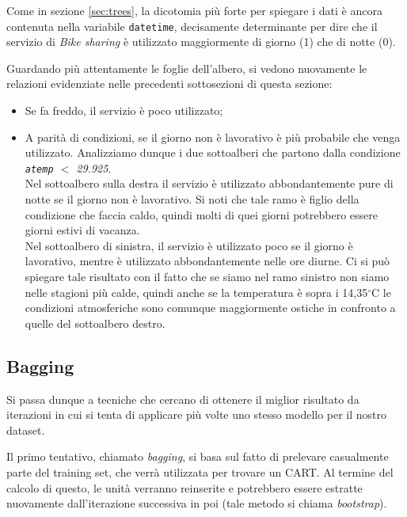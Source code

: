 Come in sezione \ref{sec:trees}, la dicotomia più forte per spiegare i dati è
ancora contenuta nella variabile \texttt{datetime}, decisamente determinante
per dire che il servizio di \emph{Bike sharing} è utilizzato maggiormente di
giorno (1) che di notte (0).

Guardando più attentamente le foglie dell'albero, si vedono nuovamente le
relazioni evidenziate nelle precedenti sottosezioni di questa sezione:

\begin{itemize}
\item Se fa freddo, il servizio è poco utilizzato;
\item A parità di condizioni, se il giorno non è lavorativo è più probabile
  che venga utilizzato. Analizziamo dunque i due sottoalberi che partono dalla
  condizione \emph{\texttt{atemp} $ < $ 29.925}. \\
  Nel sottoalbero sulla destra il servizio è utilizzato abbondantemente pure
  di notte se il giorno non è lavorativo. Si noti che tale ramo è figlio della
  condizione che faccia caldo, quindi molti di quei giorni potrebbero essere
  giorni estivi di vacanza. \\
  Nel sottoalbero di sinistra, il servizio è utilizzato poco se il giorno è
  lavorativo, mentre è utilizzato abbondantemente nelle ore diurne. Ci si può
  spiegare tale risultato con il fatto che se siamo nel ramo sinistro non
  siamo nelle stagioni più calde, quindi anche se la temperatura è sopra i
  14,35$^{\circ}$C le condizioni atmosferiche sono comunque maggiormente
  ostiche in confronto a quelle del sottoalbero destro.
\end{itemize}


\subsection{Bagging}\label{sec:class-bagging}

Si passa dunque a tecniche che cercano di ottenere il miglior risultato da
iterazioni in cui si tenta di applicare più volte uno stesso modello per il
nostro dataset.

Il primo tentativo, chiamato \emph{bagging}, si basa sul fatto di prelevare
casualmente parte del training set, che verrà utilizzata per trovare un CART.
Al termine del calcolo di questo, le unità verranno reinserite e potrebbero
essere estratte nuovamente dall'iterazione successiva in poi (tale metodo si
chiama \emph{bootstrap}).

